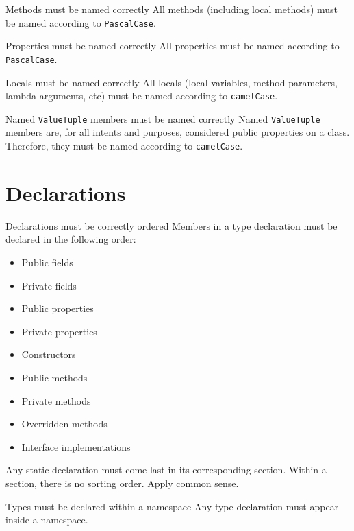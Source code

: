 \documentclass[11pt,a4paper]{article}
\begin{document}
\begin{must}{Methods must be named correctly}
All methods (including local methods) must be named according to \texttt{PascalCase}.
\end{must}

\begin{must}{Properties must be named correctly}
All properties must be named according to \texttt{PascalCase}.
\end{must}

\begin{must}{Locals must be named correctly}
All locals (local variables, method parameters, lambda arguments, etc) must be named according to \texttt{camelCase}.
\end{must}

\begin{must}{Named \texttt{ValueTuple} members must be named correctly}
Named \texttt{ValueTuple} members are, for all intents and purposes, considered public properties on a class. Therefore, they must be named according to \texttt{camelCase}.
\end{must}

\section{Declarations}
\begin{must}{Declarations must be correctly ordered}
Members in a type declaration must be declared in the following order:
\begin{itemize}
\item Public fields
\item Private fields
\item Public properties
\item Private properties
\item Constructors
\item Public methods
\item Private methods
\item Overridden methods
\item Interface implementations
\end{itemize}

Any static declaration must come last in its corresponding section. Within a section, there is no sorting order. Apply common sense.
\end{must}

\begin{must}{Types must be declared within a namespace}
Any type declaration must appear inside a namespace.
\end{must}
\end{document}
